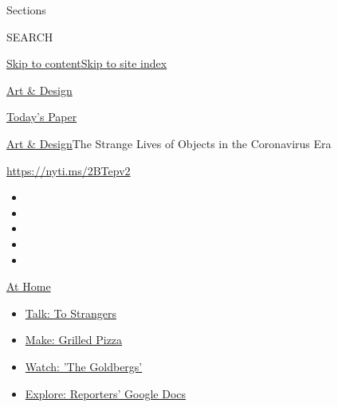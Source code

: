 Sections

SEARCH

\protect\hyperlink{site-content}{Skip to
content}\protect\hyperlink{site-index}{Skip to site index}

\href{https://www.nytimes3xbfgragh.onion/section/arts/design}{Art \&
Design}

\href{https://myaccount.nytimes3xbfgragh.onion/auth/login?response_type=cookie\&client_id=vi}{}

\href{https://www.nytimes3xbfgragh.onion/section/todayspaper}{Today's
Paper}

\href{/section/arts/design}{Art \& Design}\textbar{}The Strange Lives of
Objects in the Coronavirus Era

\url{https://nyti.ms/2BTepv2}

\begin{itemize}
\item
\item
\item
\item
\item
\end{itemize}

\href{https://www.nytimes3xbfgragh.onion/spotlight/at-home?action=click\&pgtype=Article\&state=default\&region=TOP_BANNER\&context=at_home_menu}{At
Home}

\begin{itemize}
\tightlist
\item
  \href{https://www.nytimes3xbfgragh.onion/2020/08/03/well/family/the-benefits-of-talking-to-strangers.html?action=click\&pgtype=Article\&state=default\&region=TOP_BANNER\&context=at_home_menu}{Talk:
  To Strangers}
\item
  \href{https://www.nytimes3xbfgragh.onion/2020/08/01/at-home/coronavirus-make-pizza-on-a-grill.html?action=click\&pgtype=Article\&state=default\&region=TOP_BANNER\&context=at_home_menu}{Make:
  Grilled Pizza}
\item
  \href{https://www.nytimes3xbfgragh.onion/2020/07/31/arts/television/goldbergs-abc-stream.html?action=click\&pgtype=Article\&state=default\&region=TOP_BANNER\&context=at_home_menu}{Watch:
  'The Goldbergs'}
\item
  \href{https://www.nytimes3xbfgragh.onion/interactive/2020/at-home/even-more-reporters-editors-diaries-lists-recommendations.html?action=click\&pgtype=Article\&state=default\&region=TOP_BANNER\&context=at_home_menu}{Explore:
  Reporters' Google Docs}
\end{itemize}

